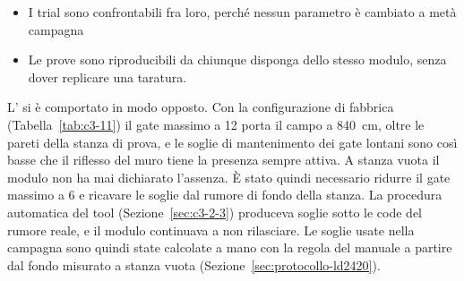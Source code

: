 \begin{itemize}
  \item I trial sono confrontabili fra loro, perché nessun parametro è cambiato a metà campagna
  \item Le prove sono riproducibili da chiunque disponga dello stesso modulo, senza dover replicare una taratura.
\end{itemize}

L'\ldc{} si è comportato in modo opposto. Con la configurazione di fabbrica (Tabella~\ref{tab:c3-11}) il gate massimo a 12 porta il campo a 840~cm, oltre le pareti della stanza di prova, e le soglie di mantenimento dei gate lontani sono così basse che il riflesso del muro tiene la presenza sempre attiva. A stanza vuota il modulo non ha mai dichiarato l'assenza. È stato quindi necessario ridurre il gate massimo a 6 e ricavare le soglie dal rumore di fondo della stanza. La procedura automatica del tool (Sezione~\ref{sec:c3-2-3}) produceva soglie sotto le code del rumore reale, e il modulo continuava a non rilasciare. Le soglie usate nella campagna sono quindi state calcolate a mano con la regola del manuale a partire dal fondo misurato a stanza vuota (Sezione~\ref{sec:protocollo-ld2420}).
